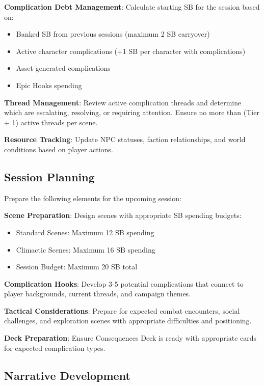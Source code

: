 \textbf{Complication Debt Management}: Calculate starting SB for the session based on:
\begin{itemize}
    \item Banked SB from previous sessions (maximum 2 SB carryover)
    \item Active character complications (+1 SB per character with complications)
    \item Asset-generated complications
    \item Epic Hooks spending
\end{itemize}

\textbf{Thread Management}: Review active complication threads and determine which are escalating, resolving, or requiring attention. Ensure no more than (Tier + 1) active threads per scene.

\textbf{Resource Tracking}: Update NPC statuses, faction relationships, and world conditions based on player actions.

\subsection*{Session Planning}

Prepare the following elements for the upcoming session:

\textbf{Scene Preparation}: Design scenes with appropriate SB spending budgets:
\begin{itemize}
    \item Standard Scenes: Maximum 12 SB spending
    \item Climactic Scenes: Maximum 16 SB spending
    \item Session Budget: Maximum 20 SB total
\end{itemize}

\textbf{Complication Hooks}: Develop 3-5 potential complications that connect to player backgrounds, current threads, and campaign themes.

\textbf{Tactical Considerations}: Prepare for expected combat encounters, social challenges, and exploration scenes with appropriate difficulties and positioning.

\textbf{Deck Preparation}: Ensure Consequences Deck is ready with appropriate cards for expected complication types.

\subsection*{Narrative Development}

